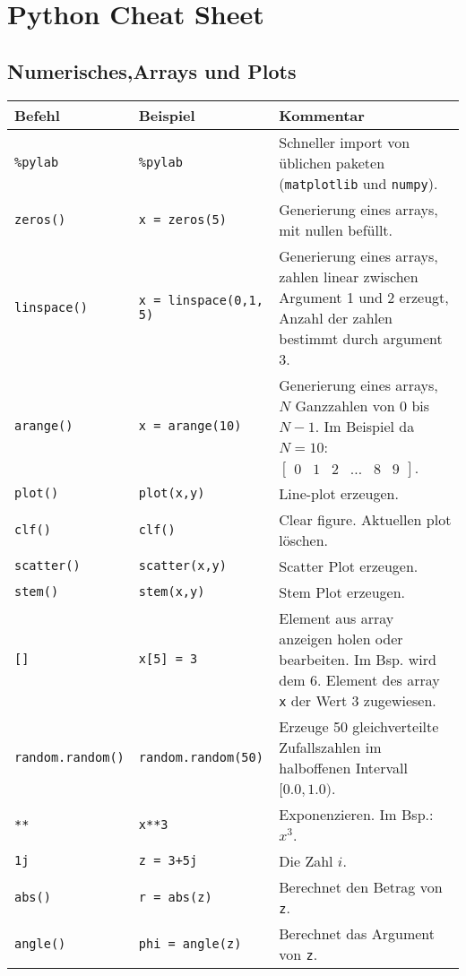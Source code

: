 

\section*{Python Cheat Sheet}\label{sec:pythonCheat}
\subsection*{Numerisches,Arrays und Plots}
\begin{table}[H]
    \centering
    \begin{tabular}{|l|l|p{7cm}|}
        \hline
    \textbf{Befehl} & \textbf{Beispiel} & \textbf{Kommentar} \\ \hline
    
    \texttt{\%pylab} & \texttt{\%pylab} & Schneller import von üblichen paketen (\texttt{matplotlib} und \texttt{numpy}). \\ \hline
    \texttt{zeros()} & \texttt{x = zeros(5)} & Generierung eines arrays, mit nullen befüllt. \\ \hline
    \texttt{linspace()} & \texttt{x = linspace(0,1, 5)} & Generierung eines arrays, zahlen linear zwischen Argument 1 und 2 erzeugt, Anzahl der zahlen bestimmt durch argument 3. \\ \hline
    \texttt{arange()} & \texttt{x = arange(10)} & Generierung eines arrays, $N$ Ganzzahlen von $0$ bis $N-1$. Im Beispiel da $N=10$: $\begin{bmatrix}0& 1& 2& \dots & 8 & 9\end{bmatrix}$. \\ \hline
    \texttt{plot()} & \texttt{plot(x,y)} & Line-plot erzeugen.  \\ \hline
    \texttt{clf()} & \texttt{clf()} & Clear figure. Aktuellen plot löschen.  \\ \hline
    \texttt{scatter()} & \texttt{scatter(x,y)} & Scatter Plot erzeugen. \\ \hline
    \texttt{stem()} & \texttt{stem(x,y)} & Stem Plot erzeugen. \\ \hline

    \texttt{[]} & \texttt{x[5] = 3} & Element aus array anzeigen holen oder bearbeiten. Im Bsp. wird dem 6. Element des array \texttt{x} der Wert 3 zugewiesen. \\ \hline
    \texttt{random.random()} & \texttt{random.random(50)} & Erzeuge 50 gleichverteilte Zufallszahlen im halboffenen Intervall $[0.0, 1.0)$. \\ \hline
    \texttt{**} & \texttt{x**3} & Exponenzieren. Im Bsp.: $x^3$. \\ \hline
    \texttt{1j} & \texttt{z = 3+5j} & Die Zahl $i$. \\ \hline
    \texttt{abs()} & \texttt{r = abs(z)} & Berechnet den Betrag von \texttt{z}. \\ \hline
    \texttt{angle()} & \texttt{phi = angle(z)} & Berechnet das Argument von \texttt{z}. \\ \hline

    \end{tabular}
\end{table}

